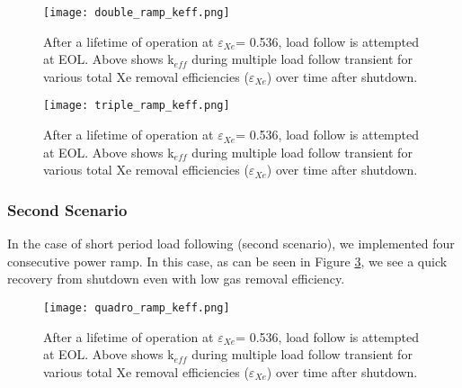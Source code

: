     \begin{figure}[htbp!]
        \begin{center}
            \texttt{[image: double\_ramp\_keff.png]}
        \end{center}
        \caption{After a lifetime of operation at $\varepsilon$$_{Xe}$= 0.536, load follow is attempted at EOL. Above shows k$_{eff}$ during multiple load follow transient for various total Xe removal efficiencies
        ($\varepsilon$$_{Xe}$) over time after shutdown.}
        \label{fig:double_keff}
    \end{figure}

    \begin{figure}[htbp!]
        \begin{center}
            \texttt{[image: triple\_ramp\_keff.png]}
        \end{center}
        \caption{After a lifetime of operation at $\varepsilon$$_{Xe}$= 0.536, load follow is attempted at EOL. Above shows  k$_{eff}$ during multiple load follow transient for various total Xe removal efficiencies
        ($\varepsilon$$_{Xe}$) over time after shutdown.}
        \label{fig:triple_keff}
    \end{figure}

\newpage
\FloatBarrier

\subsubsection{Second Scenario}

    In the case of short period load following (second scenario), we implemented
    four consecutive power ramp. In this case, as can be seen in Figure
    \ref{fig:quadro_keff}, we see a quick recovery from shutdown even with low
    gas removal efficiency.

    \begin{figure}[htbp!]
        \begin{center}
            \texttt{[image: quadro\_ramp\_keff.png]}
        \end{center}
        \caption{After a lifetime of operation at $\varepsilon$$_{Xe}$= 0.536, load follow is attempted at EOL. Above shows  k$_{eff}$ during multiple load follow transient for various total Xe removal efficiencies
        ($\varepsilon$$_{Xe}$) over time after shutdown.}
        \label{fig:quadro_keff}
    \end{figure}

\newpage
\FloatBarrier


